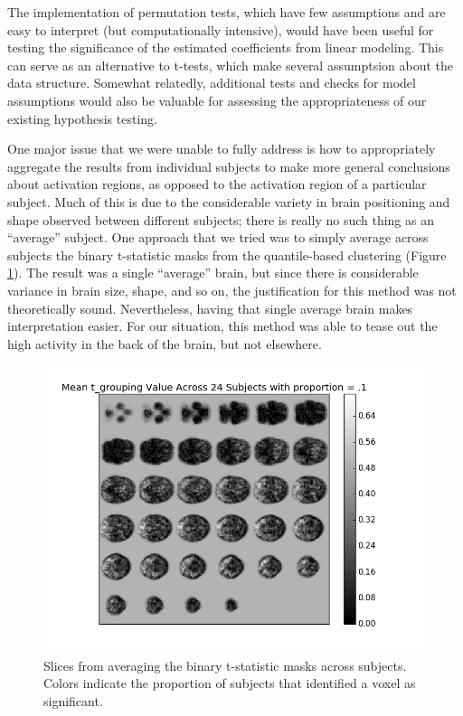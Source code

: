 \par \indent The implementation of permutation tests, which have few 
assumptions and are easy to interpret (but computationally intensive), 
would have been useful for testing the significance of the estimated 
coefficients from linear modeling. This can serve as an alternative to 
t-tests, which make several assumptsion about the data structure. 
Somewhat relatedly, additional tests and checks for model assumptions would 
also be valuable for assessing the appropriateness of our existing hypothesis 
testing. 

\par One major issue that we were unable to fully address is how to 
appropriately aggregate the results from individual subjects to make more 
general conclusions about activation regions, as opposed to the 
activation region of a particular subject. Much of this is due to the 
considerable variety in brain positioning and shape observed between different 
subjects; there is really no such thing as an ``average'' subject. One 
approach that we tried was to simply average across subjects the binary 
t-statistic masks from the quantile-based clustering (Figure \ref{fig:avgt}). 
The result was a single ``average'' brain, but since there is considerable 
variance in brain size, shape, and so on, the justification for this method 
was not theoretically sound. Nevertheless, having that single average brain 
makes interpretation easier. For our situation, this method was able to tease 
out the high activity in the back of the brain, but not elsewhere. 

\begin{figure}[ht]
\centering
	\includegraphics[width=.8\linewidth]{../images/tgroup_mean_final.png} 
	\caption{Slices from averaging the binary t-statistic masks across 
subjects. Colors indicate the proportion of subjects that identified a voxel 
as significant.}
	\label{fig:avgt}
\end{figure}

